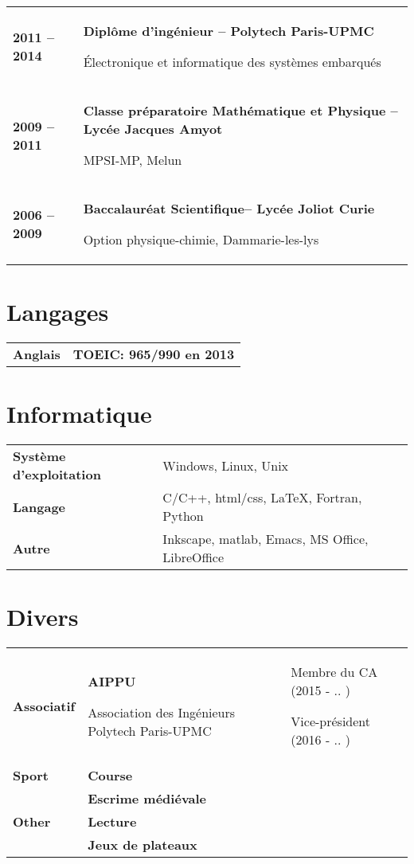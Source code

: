 \documentclass[10pt]{article}
\makeatletter
\newlength{\sidewidth}
\newlength{\sidewidthT}
\newlength{\mainwidth}
\newlength{\mainwidthT}
\newenvironment{CVtable}
{%
  \begin{tabular}
    {@{}>{\bfseries}p{\sidewidth}@{}>{\ding{229} \RaggedRight}p{\mainwidth}@{}}%
}
{\end{tabular}}
\newenvironment{CVtable3}
{%
  \begin{tabular}
    {@{}>{\bfseries}p{\sidewidthT}@{}>{\ding{229} }p{\mainwidthT}@{}>{\RaggedRight}p{\mainwidthT}@{}}%
}
{\end{tabular}}
\makeatother
\begin{document}
\begin{CVtable}
2011 -- 2014 &  \textbf{Diplôme d'ingénieur -- Polytech Paris-UPMC}\par
               Électronique et informatique des systèmes embarqués \\
2009 -- 2011 &  \textbf{Classe préparatoire Mathématique et Physique -- Lycée Jacques Amyot}\par MPSI-MP, Melun\\
2006 -- 2009 &  \textbf{Baccalauréat Scientifique-- Lycée Joliot Curie}\par Option physique-chimie, Dammarie-les-lys
\end{CVtable}
 
\section{Langages}
\begin{CVtable}
Anglais & \textbf{TOEIC: 965/990 en 2013} \\
\end{CVtable}

\section{Informatique}
\begin{CVtable}
Système d'exploitation & Windows, Linux, Unix \\
Langage & C/C++, html/css, LaTeX, Fortran, Python \\
Autre & Inkscape, matlab, Emacs, MS Office, LibreOffice
\end{CVtable}


\section{Divers}
\begin{CVtable3}
Associatif & \textbf{AIPPU} \par Association des Ingénieurs Polytech Paris-UPMC & Membre du CA (2015 - .. ) \par
                      Vice-président (2016 - .. )\\ 
Sport & \textbf{Course} & \\
      & \textbf{Escrime médiévale} & \\
Other & \textbf{Lecture} & \\
      & \textbf{Jeux de plateaux} & \\
\end{CVtable3}
\end{document}
